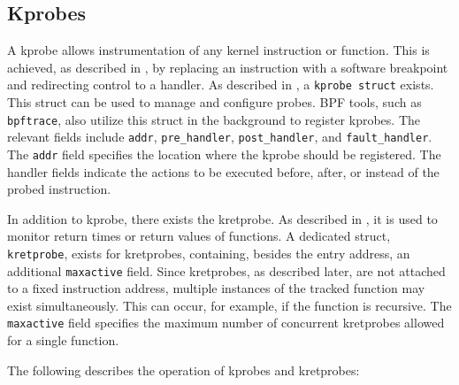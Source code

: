 \subsection{Kprobes}
A \ac{kprobe} allows instrumentation of any kernel instruction or function.  
This is achieved, as described in \cite[p. 101-104]{Mavinakayanahalli_Panchamukhi_Keniston_Keshavamurthy_Hiramatsu_2006}, by replacing an instruction with a software breakpoint and redirecting control to a handler.  
As described in \cite[p. 102]{Mavinakayanahalli_Panchamukhi_Keniston_Keshavamurthy_Hiramatsu_2006}, a \texttt{\ac{kprobe} struct} exists.  
This struct can be used to manage and configure probes.  
BPF tools, such as \texttt{bpftrace}, also utilize this struct in the background to register \acp{kprobe}.  
The relevant fields include \texttt{addr}, \texttt{pre\_handler}, \texttt{post\_handler}, and \texttt{fault\_handler}.  
The \texttt{addr} field specifies the location where the \ac{kprobe} should be registered.  
The handler fields indicate the actions to be executed before, after, or instead of the probed instruction.  

In addition to \ac{kprobe}, there exists the \ac{kretprobe}.  
As described in \cite{Mavinakayanahalli_Panchamukhi_Keniston_Keshavamurthy_Hiramatsu_2006}, it is used to monitor return times or return values of functions.  
A dedicated struct, \texttt{kretprobe}, exists for \acp{kretprobe}, containing, besides the entry address, an additional \texttt{maxactive} field.  
Since \acp{kretprobe}, as described later, are not attached to a fixed instruction address, multiple instances of the tracked function may exist simultaneously.  
This can occur, for example, if the function is recursive.  
The \texttt{maxactive} field specifies the maximum number of concurrent \acp{kretprobe} allowed for a single function.  

The following describes the operation of \acp{kprobe} and \acp{kretprobe}:  

